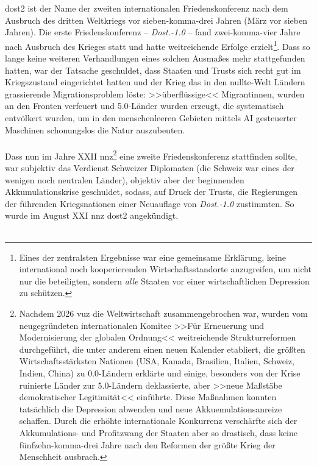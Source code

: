 \ac{dost2} ist der Name der zweiten internationalen
Friedenskonferenz nach dem Ausbruch des dritten Weltkriegs vor sieben-komma-drei
Jahren (März vor sieben Jahren).
Die erste Friedenskonferenz -- \emph{Dost.-1.0} -- fand zwei-komma-vier Jahre nach
Ausbruch des Krieges statt und hatte weitreichende Erfolge erzielt\footnote{
  Eines der zentralsten Ergebnisse war eine gemeinsame Erklärung, keine
  international noch kooperierenden Wirtschaftsstandorte anzugreifen, um nicht
  nur die beteiligten, sondern \emph{alle} Staaten vor einer wirtschaftlichen
  Depression zu schützen.
}.
Dass so lange keine weiteren Verhandlungen eines solchen Ausmaßes mehr
stattgefunden hatten, war der Tatsache geschuldet, dass Staaten und Trusts sich
recht gut im Kriegszustand eingerichtet hatten und der Krieg das in den
nullte-Welt Ländern grassierende Migrationsproblem löste: >>überflüssige<<
Migrantinnen, wurden an den Fronten verfeuert und 5.0-Länder wurden
erzeugt, die systematisch entvölkert wurden, um in den menschenleeren Gebieten
mittels AI gesteuerter Maschinen schonungslos die Natur auszubeuten.\\\\
Dass nun im Jahre XXII \ac{nnz}\footnote{
  Nachdem 2026 \ac{vuz} die Weltwirtschaft zusammengebrochen war, wurden vom
  neugegründeten internationalen Komitee >>Für Erneuerung und Modernisierung der
  globalen Ordnung<< weitreichende Strukturreformen durchgeführt, die
  unter anderem einen neuen Kalender etabliert, die größten
  Wirtschaftsstärksten Nationen (USA, Kanada, Brasilien, Italien, Schweiz,
  Indien, China) zu 0.0-Ländern erklärte und einige, besonders
  von der Krise ruinierte Länder zur 5.0-Ländern deklassierte, aber >>neue
  Maßstäbe demokratischer Legitimität<< einführte.
  Diese Maßnahmen konnten tatsächlich die Depression abwenden und neue
  Akkuemulationsanreize schaffen. 
  Durch die erhöhte internationale Konkurrenz verschärfte sich der
  Akkumulations- und Profitzwang der Staaten aber so drastisch, dass keine
  fünfzehn-komma-drei Jahre nach den Reformen der größte Krieg der Menschheit
  ausbrach.
} eine zweite Friedenskonferenz stattfinden sollte, war subjektiv das Verdienst
Schweizer Diplomaten (die Schweiz war eines der wenigen noch neutralen Länder),
objektiv aber der beginnenden Akkumulationskrise geschuldet, sodass, auf Druck
der Trusts, die Regierungen der führenden Kriegsnationen einer Neuauflage von
\emph{Dost.-1.0} zustimmten. 
So wurde im August XXI \ac{nnz} \ac{dost2} angekündigt.\\\\
